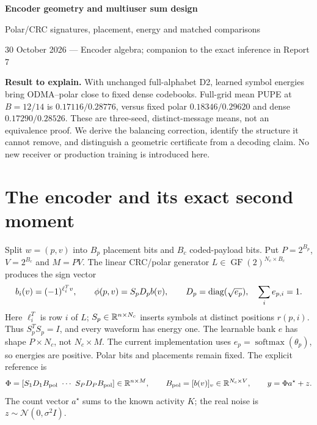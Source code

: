 \documentclass[10pt,a4paper]{article}
\newcommand{\GF}{\operatorname{GF}}
\begin{document}
{\LARGE\bfseries Encoder geometry and multiuser sum design}\par
{\large Polar/CRC signatures, placement, energy and matched comparisons}\par
{\color{muted}30 October 2026 --- Encoder algebra; companion to the exact inference in Report 7}

\textbf{Result to explain.} With unchanged full-alphabet D2, learned symbol energies bring ODMA--polar close to
fixed dense codebooks. Full-grid mean PUPE at $B=12/14$ is $0.17116/0.28776$, versus fixed polar
$0.18346/0.29620$ and dense $0.17290/0.28526$. These are three-seed, distinct-message means, not an equivalence proof.
We derive the balancing correction, identify the structure it cannot remove, and distinguish a geometric certificate
from a decoding claim. No new receiver or production training is introduced here.

\section{The encoder and its exact second moment}
Split $w=(p,v)$ into $B_p$ placement bits and $B_c$ coded-payload bits. Put $P=2^{B_p}$, $V=2^{B_c}$ and $M=PV$.
The linear CRC/polar generator $L\in\GF(2)^{N_c\times B_c}$ produces the sign vector
\begin{equation}
 b_i(v)=(-1)^{\ell_i^T v},\qquad
 \phi(p,v)=S_pD_pb(v),\qquad D_p=\operatorname{diag}(\sqrt{e_p}),\quad \sum_i e_{p,i}=1.
 \label{eq:encoder}
\end{equation}
Here $\ell_i^T$ is row $i$ of $L$; $S_p\in\mathbb{R}^{n\times N_c}$ inserts symbols at distinct positions $r(p,i)$.
Thus $S_p^TS_p=I$, and every waveform has energy one. The learnable bank $e$ has shape $P\times N_c$,
not $N_c\times M$. The current implementation uses $e_p=\operatorname{softmax}(\theta_p)$, so energies are positive.
Polar bits and placements remain fixed. The explicit reference is
\begin{equation}
 \Phi=[S_1D_1B_{\rm pol}\ \cdots\ S_PD_PB_{\rm pol}]\in\mathbb{R}^{n\times M},\qquad
 B_{\rm pol}=[b(v)]_v\in\mathbb{R}^{N_c\times V},\qquad y=\Phi a^\star+z.
\end{equation}
The count vector $a^\star$ sums to the known activity $K$; the real noise is $z\sim\mathcal N(0,\sigma^2I)$.
\end{document}
